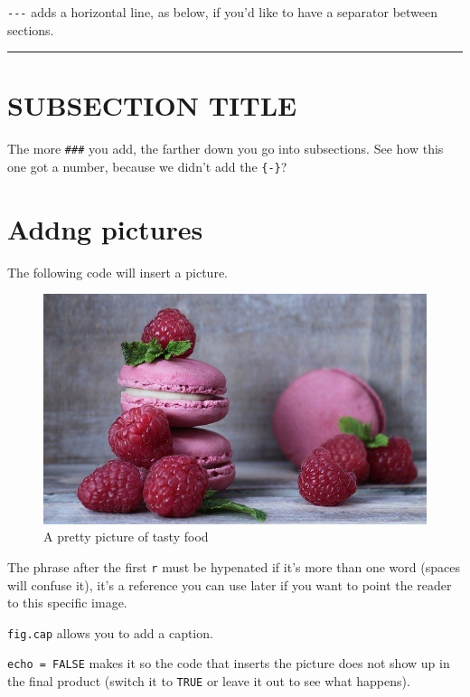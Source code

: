 \documentclass[
]{book}
\begin{document}
\texttt{-\/-\/-} adds a horizontal line, as below, if you'd like to have a separator between sections.

\begin{center}\rule{0.5\linewidth}{0.5pt}\end{center}

\hypertarget{subsection-title}{%
\section{SUBSECTION TITLE}\label{subsection-title}}

The more \texttt{\#\#\#} you add, the farther down you go into subsections.
See how this one got a number, because we didn't add the \texttt{\{-\}}?

\hypertarget{picturetemplate}{%
\section*{Addng pictures}\label{picturetemplate}}


The following code will insert a picture.

\begin{figure}
\centering
\includegraphics{images/macarons.jpg}
\caption{\label{fig:example-macarons}A pretty picture of tasty food}
\end{figure}

The phrase after the first \texttt{r} must be hypenated if it's more than one word (spaces will confuse it),
it's a reference you can use later if you want to point the reader to this specific image.

\texttt{fig.cap} allows you to add a caption.

\texttt{echo\ =\ FALSE} makes it so the code that inserts the picture does not show up in the final product (switch it to \texttt{TRUE} or leave it out to see what happens).
\end{document}
